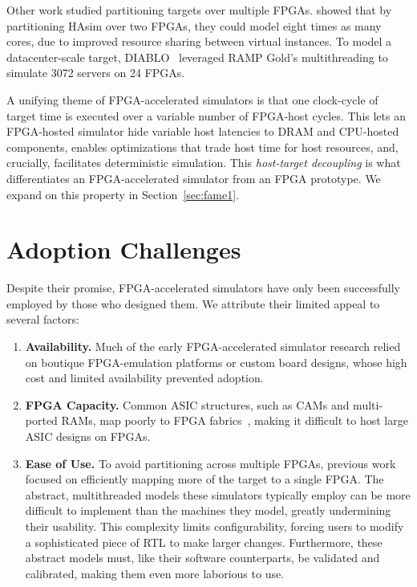 Other work studied partitioning targets over multiple FPGAs.
\cite{LIFPGADesign} showed that by partitioning HAsim over two FPGAs, they
could model eight times as many cores, due to improved resource sharing between
virtual instances. To model a datacenter-scale target, DIABLO~\cite{Diablo}
leveraged RAMP Gold's multithreading to simulate 3072 servers on 24 FPGAs.

A unifying theme of FPGA-accelerated simulators is that one clock-cycle of
target time is executed over a variable number of FPGA-host
cycles.  This lets an FPGA-hosted simulator hide
variable host latencies to DRAM and CPU-hosted components, enables
optimizations that trade host time for host resources, and, crucially,
facilitates deterministic simulation.  This \emph{host-target
decoupling} is what differentiates an FPGA-accelerated simulator from
an FPGA prototype. We expand on this property in
Section~\ref{sec:fame1}.

\section{Adoption Challenges}

Despite their promise, FPGA-accelerated simulators have only been
successfully employed by those who designed them. We attribute their
limited appeal to several factors:

\begin{enumerate}

    \item \textbf{Availability.} Much of the early FPGA-accelerated
    simulator research relied on boutique FPGA-emulation
    platforms or custom board designs, whose high cost and
    limited availability prevented adoption.

    \item \textbf{FPGA Capacity.} Common ASIC structures, such as CAMs and
        multi-ported RAMs, map poorly to FPGA
        fabrics~\cite{FPGAGap2}, making it difficult to host large
        ASIC designs on FPGAs.

    \item \textbf{Ease of Use.} To avoid partitioning across multiple
     FPGAs, previous work focused on efficiently mapping more of the
     target to a single FPGA. The abstract, multithreaded models these
     simulators typically employ can be more difficult to implement
     than the machines they model, greatly undermining their
     usability. This complexity limits configurability, forcing users
     to modify a sophisticated piece of RTL to make larger
     changes. Furthermore, these abstract models must, like their
     software counterparts, be validated and calibrated, making them
     even more laborious to use.
\end{enumerate}

